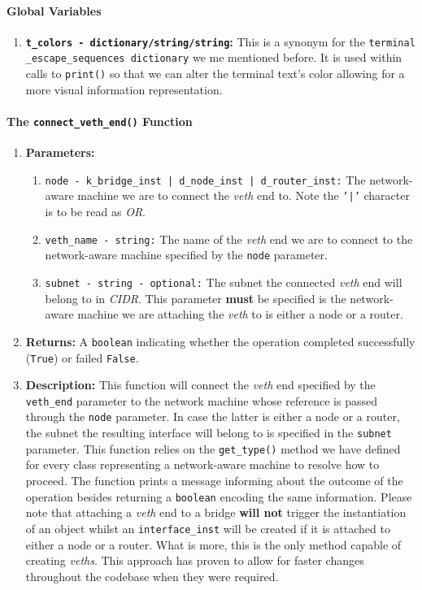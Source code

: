     \paragraph{Global Variables}
        \begin{enumerate}
            \item \textbf{\texttt{\allowbreak t\_colors - dictionary/string/string}:} This is a synonym for the \texttt{\allowbreak terminal \_escape\_sequences dictionary} we me mentioned before. It is used within calls to \texttt{print()} so that we can alter the terminal text's color allowing for a more visual information representation.
        \end{enumerate}

    \paragraph{The \texttt{connect\_veth\_end()} Function}
        \begin{enumerate}
            \item \textbf{Parameters:}
            \begin{enumerate}
                \item \texttt{node - k\_bridge\_inst | d\_node\_inst | d\_router\_inst:} The network-aware machine we are to connect the \textit{veth} end to. Note the \texttt{'|'} character is to be read as \textit{OR}.
                \item \texttt{veth\_name - string:} The name of the \textit{veth} end we are to connect to the network-aware machine specified by the \texttt{node} parameter.
                \item \texttt{subnet - string - optional:} The subnet the connected \textit{veth} end will belong to in \textit{CIDR}. This parameter \textbf{must} be specified is the network-aware machine we are attaching the \textit{veth} to is either a node or a router.
            \end{enumerate}
            \item \textbf{Returns:} A \texttt{boolean} indicating whether the operation completed successfully (\texttt{True}) or failed \texttt{False}.
            \item \textbf{Description:} This function will connect the \textit{veth} end specified by the \texttt{veth\_end} parameter to the network machine whose reference is passed through the \texttt{node} parameter. In case the latter is either a node or a router, the subnet the resulting interface will belong to is specified in the \texttt{subnet} parameter. This function relies on the \texttt{get\_type()} method we have defined for every class representing a network-aware machine to resolve how to proceed. The function prints a message informing about the outcome of the operation besides returning a \texttt{boolean} encoding the same information. Please note that attaching a \textit{veth} end to a bridge \textbf{will not} trigger the instantiation of an object whilst an \texttt{interface\_inst} will be created if it is attached to either a node or a router. What is more, this is the only method capable of creating \textit{veths}. This approach has proven to allow for faster changes throughout the codebase when they were required.
        \end{enumerate}